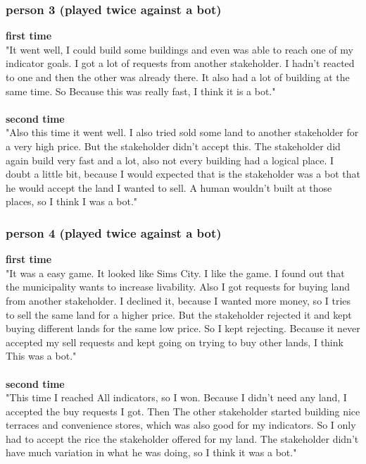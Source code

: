 \subsubsection{person 3 (played twice against a bot)}
\textbf{first time}\\
"It went well, I could build some buildings and even was able to reach one of my indicator goals. I got a lot of requests from another stakeholder. I hadn't reacted to one and then the other was already there. It also had a lot of building at the same time. So Because this was really fast, I think it is a bot."
\\ \\
\textbf{second time}\\
"Also this time it went well. I also tried sold some land to another stakeholder for a very high price. But the stakeholder didn't accept this. The stakeholder did again build very fast and a lot, also not every building had a logical place. I doubt a little bit, because I would expected that is the stakeholder was a bot that he would accept the land I wanted to sell. A human wouldn't built at those places, so I think I was a bot." 

\subsubsection{person 4 (played twice against a bot)}
 \textbf{first time}\\
 "It was a easy game. It looked like Sims City. I like the game. I found out that the municipality wants to increase livability. Also I got requests for buying land from another stakeholder. I declined it, because I wanted more money, so I tries to sell the same land for a higher price. But the stakeholder rejected it and kept buying different lands for the same low price. So I kept rejecting. Because it never accepted my sell requests and kept going on trying to buy other lands, I think This was a bot." 
 \\ \\
 \textbf{second time}\\
 "This time I reached All indicators, so I won. Because I didn't need any land, I accepted the buy requests I got. Then The other stakeholder started building nice terraces and convenience stores, which was also good for my indicators. So I only had to accept the rice the stakeholder offered for my land. The stakeholder didn't have much variation in what he was doing, so I think it was a bot."

